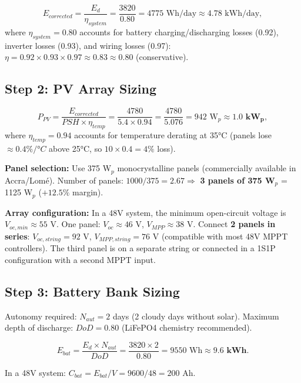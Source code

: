 \documentclass[12pt,a4paper,openany]{book}
\begin{document}
\begin{equation}
  E_{corrected} = \frac{E_d}{\eta_{system}} = \frac{3820}{0.80} = 4775\text{ Wh/day}\approx 4.78\text{ kWh/day},
\end{equation}
where $\eta_{system}=0.80$ accounts for battery charging/discharging losses (0.92), inverter losses (0.93), and wiring losses (0.97): $\eta=0.92\times0.93\times0.97\approx0.83\approx0.80$ (conservative).

\subsection{Step 2: PV Array Sizing}

\begin{equation}
  P_{PV} = \frac{E_{corrected}}{PSH\times\eta_{temp}} = \frac{4780}{5.4\times0.94} = \frac{4780}{5.076} = 942\text{ W}_p\approx\mathbf{1.0\text{ kW}_p},
\end{equation}
where $\eta_{temp}=0.94$ accounts for temperature derating at 35°C (panels lose $\approx0.4\%/°C$ above 25°C, so $10\times0.4=4\%$ loss).

\textbf{Panel selection:} Use 375 W$_p$ monocrystalline panels (commercially available in Accra/Lomé).
Number of panels: $1000/375=2.67\Rightarrow$ \textbf{3 panels of 375 W$_p$} = 1125 W$_p$ ($+12.5\%$ margin).

\textbf{Array configuration:} In a 48V system, the minimum open-circuit voltage is $V_{oc,min}\approx55$ V. One panel: $V_{oc}\approx46$ V, $V_{MPP}\approx38$ V. Connect \textbf{2 panels in series}: $V_{oc,string}=92$ V, $V_{MPP,string}=76$ V (compatible with most 48V MPPT controllers). The third panel is on a separate string or connected in a 1S1P configuration with a second MPPT input.

\subsection{Step 3: Battery Bank Sizing}

Autonomy required: $N_{aut}=2$ days (2 cloudy days without solar). Maximum depth of discharge: $DoD=0.80$ (LiFePO4 chemistry recommended).

\begin{equation}
  E_{bat} = \frac{E_d\times N_{aut}}{DoD} = \frac{3820\times2}{0.80} = 9550\text{ Wh}\approx\mathbf{9.6\text{ kWh}}.
\end{equation}

In a 48V system: $C_{bat}=E_{bat}/V=9600/48=200$ Ah.
\end{document}
